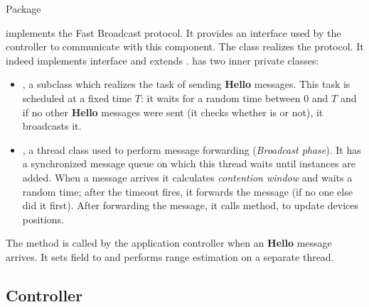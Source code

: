 Package 
\begin{center}
\end{center} 
implements the Fast Broadcast protocol. It provides an interface  used by the controller to communicate with this component. The class  realizes the protocol. It indeed implements  interface and extends .  has two inner private classes:
\begin{itemize}
	\item {}, a  subclass which realizes the task of sending \textbf{Hello} messages. This task is scheduled at a fixed time $T$: it waits for a random time between $0$ and $T$ and if no other \textbf{Hello} messages were sent (it checks whether  is  or not), it broadcasts it.
	\item {}, a thread class used to perform message forwarding (\textit{Broadcast phase}). It has a synchronized message queue on which this thread waits until  instances are added. When a message arrives it calculates \textit{contention window} and waits a random time; after the timeout fires, it forwards the message (if no one else did it first). After forwarding the message, it calls  method, to update devices positions.
\end{itemize} 

The method  is called by the application controller when an \textbf{Hello} message arrives. It sets  field to  and performs range estimation on a separate thread.

\subsection{Controller}

